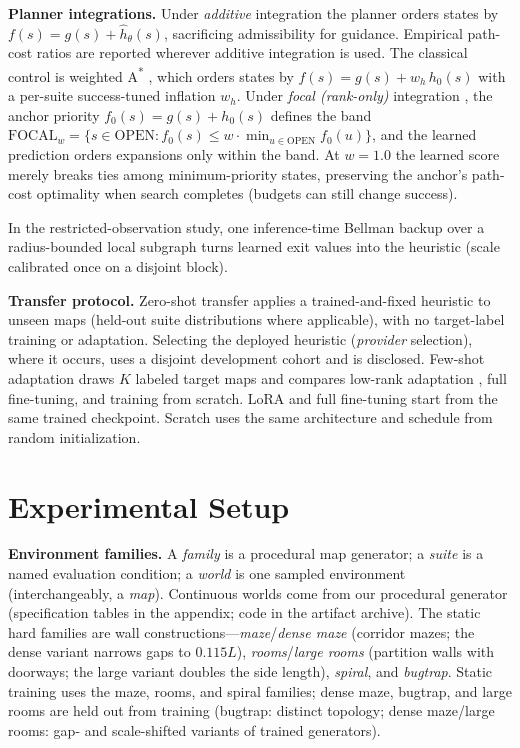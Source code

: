 \documentclass[letterpaper]{article} %
\begin{document}
\textbf{Planner integrations.} Under \emph{additive} integration the planner orders states by $f(s) = g(s) + \hat h_\theta(s)$, sacrificing admissibility for guidance. Empirical path-cost ratios are reported wherever additive integration is used. The classical control is weighted A\textsuperscript{*} \citep{pohl1970}, which orders states by $f(s) = g(s) + w_h\, h_0(s)$ with a per-suite success-tuned inflation $w_h$. Under \emph{focal (rank-only)} integration \citep{pohl1970,pearl1982semiadmissible}, the anchor priority $f_0(s) = g(s) + h_0(s)$ defines the band $\mathrm{FOCAL}_w = \{ s \in \mathrm{OPEN} : f_0(s) \leq w \cdot \min_{u \in \mathrm{OPEN}} f_0(u) \}$, and the learned prediction orders expansions only within the band. At $w{=}1.0$ the learned score merely breaks ties among minimum-priority states, preserving the anchor's path-cost optimality when search completes (budgets can still change success).

In the restricted-observation study, one inference-time Bellman backup over a radius-bounded local subgraph turns learned exit values into the heuristic (scale calibrated once on a disjoint block).

\textbf{Transfer protocol.} Zero-shot transfer applies a trained-and-fixed heuristic to unseen maps (held-out suite distributions where applicable), with no target-label training or adaptation. Selecting the deployed heuristic (\emph{provider} selection), where it occurs, uses a disjoint development cohort and is disclosed. Few-shot adaptation draws $K$ labeled target maps and compares low-rank adaptation \citep[LoRA, rank 8 for the HRM, rank 24 for the ON-LSTM's wider hidden layer;][]{hu2021lora}, full fine-tuning, and training from scratch. LoRA and full fine-tuning start from the same trained checkpoint. Scratch uses the same architecture and schedule from random initialization.

\section{Experimental Setup}

\textbf{Environment families.} A \emph{family} is a procedural map generator; a \emph{suite} is a named evaluation condition; a \emph{world} is one sampled environment (interchangeably, a \emph{map}). Continuous worlds come from our procedural generator (specification tables in the appendix; code in the artifact archive). The static hard families are wall constructions---\emph{maze}/\emph{dense maze} (corridor mazes; the dense variant narrows gaps to $0.115L$), \emph{rooms}/\emph{large rooms} (partition walls with doorways; the large variant doubles the side length), \emph{spiral}, and \emph{bugtrap}. Static training uses the maze, rooms, and spiral families; dense maze, bugtrap, and large rooms are held out from training (bugtrap: distinct topology; dense maze/large rooms: gap- and scale-shifted variants of trained generators).
\end{document}
